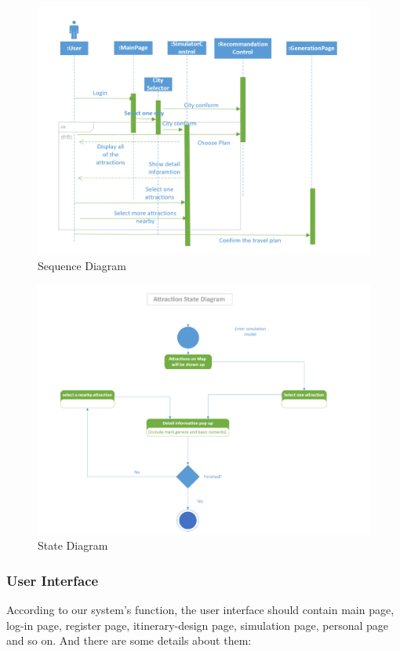 \documentclass[10pt]{article}
\begin{document}
\begin{figure}[H]
	\centering
	\includegraphics[width=14cm]{test.png} 
	\caption{Sequence Diagram}
	\label{Sequence Diagram}
\end{figure}

\begin{figure}[H]
	\centering
	\includegraphics[width=14cm]{9.png} 
	\caption{State Diagram}
	\label{State Diagram}
\end{figure}

\subsubsection{User Interface} 
According to our system’s function, the user interface should contain main page, log-in page, register page, itinerary-design page, simulation page, personal page and so on. And there are some details about them:
\end{document}
